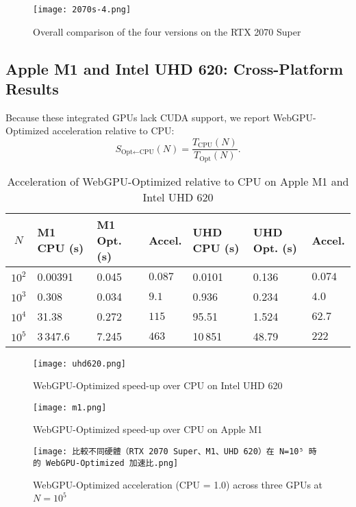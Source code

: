 \documentclass[PhD]{PHlab-thesis}
\begin{document}
\begin{figure}[htbp]
  \centering
  \texttt{[image: 2070s-4.png]}
  \caption{Overall comparison of the four versions on the RTX 2070 Super}
  \label{fig:2070s-overall-4versions}
\end{figure}

\subsection{Apple M1 and Intel UHD 620: Cross-Platform Results}
Because these integrated GPUs lack CUDA support, we report WebGPU-Optimized acceleration relative to CPU:
\[
S_{\text{Opt}\leftarrow\text{CPU}}(N)=\frac{T_{\text{CPU}}(N)}{T_{\text{Opt}}(N)} .
\]

\begin{table}[h]
  \centering
  \renewcommand{\arraystretch}{1.9}
  \setlength{\tabcolsep}{4pt}
  \small
  \begin{tabularx}{\textwidth}{|c|X|X|X|X|X|X|}
    \hline
    $N$ & M1 CPU (s) & M1 Opt. (s) & Accel. & UHD CPU (s) & UHD Opt. (s) & Accel. \\
    \hline
    $10^{2}$ & 0.00391 & 0.045  & $0.087$ & 0.0101 & 0.136  & $0.074$ \\
    $10^{3}$ & 0.308   & 0.034  & $9.1$   & 0.936  & 0.234  & $4.0$ \\
    $10^{4}$ & 31.38   & 0.272  & $115$   & 95.51  & 1.524  & $62.7$ \\
    $10^{5}$ & 3\,347.6 & 7.245 & $463$   & 10\,851 & 48.79 & $222$ \\
    \hline
  \end{tabularx}
  \caption{Acceleration of WebGPU-Optimized relative to CPU on Apple M1 and Intel UHD 620}
  \label{tab:cross_platform}
\end{table}

\begin{figure}[h]
  \centering
  \texttt{[image: uhd620.png]}
  \caption{WebGPU-Optimized speed-up over CPU on Intel UHD 620}
  \label{fig:uhd620}
\end{figure}

\begin{figure}[h]
  \centering
  \texttt{[image: m1.png]}
  \caption{WebGPU-Optimized speed-up over CPU on Apple M1}
  \label{fig:m1}
\end{figure}

\begin{figure}[h]
  \centering
  \texttt{[image: 比較不同硬體（RTX 2070 Super、M1、UHD 620）在 N=10⁵ 時的 WebGPU-Optimized 加速比.png]}
  \caption{WebGPU-Optimized acceleration (CPU = 1.0) across three GPUs at $N=10^{5}$}
  \label{fig:cross-hw1}
\end{figure}
\clearpage
\end{document}
